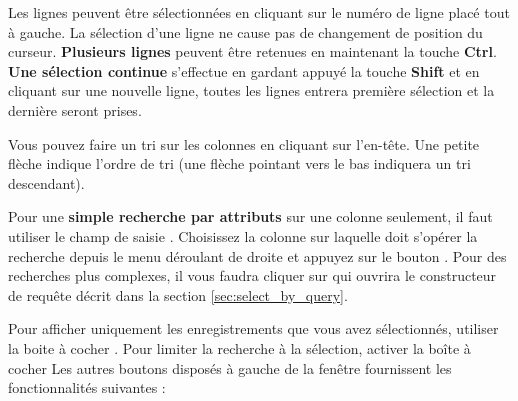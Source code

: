 Les lignes peuvent être sélectionnées en cliquant sur le numéro de ligne placé tout à gauche. La sélection d'une ligne ne cause pas de changement de position du curseur. \textbf{Plusieurs lignes} peuvent être retenues en maintenant la touche \textbf{Ctrl}. \textbf{Une sélection continue} s'effectue en gardant appuyé la touche \textbf{Shift} et en cliquant sur une nouvelle ligne, toutes les lignes entrera première sélection et la dernière seront prises.

Vous pouvez faire un tri sur les colonnes en cliquant sur l'en-tête. Une petite flèche indique l'ordre de tri (une flèche pointant vers le bas indiquera un tri descendant).

Pour une \textbf{simple recherche par attributs} sur une colonne seulement, il faut utiliser le champ de saisie . Choisissez la colonne sur laquelle doit s'opérer la recherche depuis le menu déroulant de droite et appuyez sur le bouton . Pour des recherches plus complexes, il vous faudra cliquer sur  qui ouvrira le constructeur de requête décrit dans la section \ref{sec:select_by_query}.

Pour afficher uniquement les enregistrements que vous avez sélectionnés, utiliser la boite à cocher . Pour limiter la recherche à la sélection, activer la boîte à cocher  Les autres boutons disposés à gauche de la fenêtre fournissent les fonctionnalités suivantes :

